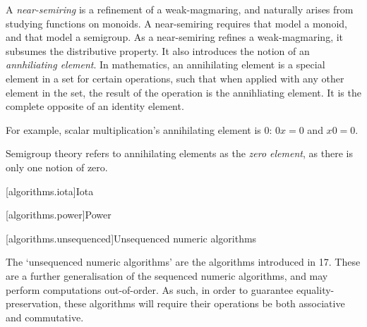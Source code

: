 A \textit{near-semiring} is a refinement of a weak-magmaring, and naturally arises from studying
functions on monoids\cite{wikipedia_near_semiring}. A near-semiring requires that  model
a monoid, and that  model a semigroup. As a near-semiring refines a weak-magmaring, it
subsumes the distributive property. It also introduces the notion of an
\textit{annhiliating element}\cite{wikipedia_absorb}. In mathematics, an annihilating element is a
special element in a set for certain operations, such that when applied with any other element in
the set, the result of the operation is the annihliating element. It is the complete opposite of an
identity element.

\begin{example}
   For example, scalar multiplication's annihilating element is $0$: $0x = 0$ and $x0 = 0$.
\end{example}

Semigroup theory refers to annihilating elements as the \textit{zero element}, as there is only one
notion of zero.


[algorithms.iota]{Iota}


[algorithms.power]{Power}


[algorithms.unsequenced]{Unsequenced numeric algorithms}

The `unsequenced numeric algorithms' are the  algorithms introduced in \Cpp{}17.
These are a further generalisation of the sequenced numeric algorithms, and may perform computations
out-of-order. As such, in order to guarantee equality-preservation, these algorithms will require
their operations be both associative and commutative.

